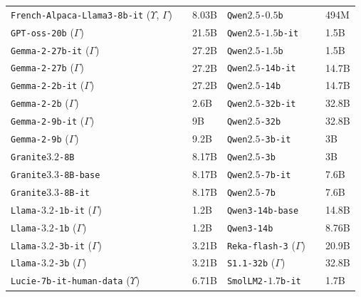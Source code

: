 \begin{tabular}{llllll}
\texttt{French-Alpaca-Llama3-8b-it} ($\Upsilon$,   $\Gamma$)   & \citet{alpaca} & 8.03B & \texttt{Qwen$2.5$-$0.5$b} & \citet{hui2024qwen2} & 494M \\
\texttt{GPT-oss-20b} ($\Gamma$) & \citet{gptoss} & 21.5B & \texttt{Qwen$2.5$-$1.5$b-it} & \citet{hui2024qwen2} & 1.5B \\
\texttt{Gemma-2-27b-it} ($\Gamma$) & \citet{mesnard2024gemma} & 27.2B & \texttt{Qwen$2.5$-$1.5$b} & \citet{hui2024qwen2} & 1.5B \\
\texttt{Gemma-2-27b} ($\Gamma$) & \citet{mesnard2024gemma} & 27.2B & \texttt{Qwen$2.5$-14b-it} & \citet{hui2024qwen2} & 14.7B \\
\texttt{Gemma-2-2b-it} ($\Gamma$) & \citet{mesnard2024gemma} & 27.2B & \texttt{Qwen$2.5$-14b} & \citet{hui2024qwen2} & 14.7B \\
\texttt{Gemma-2-2b} ($\Gamma$) & \citet{mesnard2024gemma} & 2.6B & \texttt{Qwen$2.5$-32b-it} & \citet{hui2024qwen2} & 32.8B \\
\texttt{Gemma-2-9b-it} ($\Gamma$) & \citet{mesnard2024gemma} & 9B & \texttt{Qwen$2.5$-32b} & \citet{hui2024qwen2} & 32.8B \\
\texttt{Gemma-2-9b} ($\Gamma$) & \citet{mesnard2024gemma} & 9.2B & \texttt{Qwen$2.5$-3b-it} & \citet{hui2024qwen2} & 3B \\
\texttt{Granite$3.2$-8B} & \citet{granite2024granite} & 8.17B & \texttt{Qwen$2.5$-3b} & \citet{hui2024qwen2} & 3B \\
\texttt{Granite$3.3$-8B-base} & \citet{granite2024granite} & 8.17B & \texttt{Qwen$2.5$-7b-it} & \citet{hui2024qwen2} & 7.6B \\
\texttt{Granite$3.3$-8B-it} & \citet{granite2024granite} & 8.17B & \texttt{Qwen$2.5$-7b} & \citet{hui2024qwen2} & 7.6B \\
\texttt{Llama-$3.2$-1b-it} ($\Gamma$) & \citet{grattafiori2024llama} & 1.2B & \texttt{Qwen3-14b-base} & \citet{qwen3technicalreport} & 14.8B \\
\texttt{Llama-$3.2$-1b} ($\Gamma$) & \citet{grattafiori2024llama} & 1.2B & \texttt{Qwen3-14b} & \citet{qwen3technicalreport} & 8.76B \\
\texttt{Llama-$3.2$-3b-it} ($\Gamma$) & \citet{grattafiori2024llama} & 3.21B & \texttt{Reka-flash-3} ($\Gamma$) & \citet{reka} & 20.9B \\
\texttt{Llama-$3.2$-3b} ($\Gamma$) & \citet{grattafiori2024llama} & 3.21B & \texttt{S1.1-32b} ($\Gamma$) & \citet{s11} & 32.8B \\
\texttt{Lucie-7b-it-human-data} ($\Upsilon$) & \citet{openllm2025lucie} & 6.71B & \texttt{SmolLM2-$1.7$b-it} & \citet{allal2025smollm2smolgoesbig} & 1.7B \\

\end{tabular}

